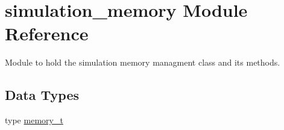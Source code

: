 \hypertarget{namespacesimulation__memory}{}\section{simulation\+\_\+memory Module Reference}
\label{namespacesimulation__memory}


Module to hold the simulation memory managment class and its methods.  


\subsection*{Data Types}
\begin{DoxyCompactItemize}
\item 
type \hyperlink{structsimulation__memory_1_1memory__t}{memory\+\_\+t}
\end{DoxyCompactItemize}
